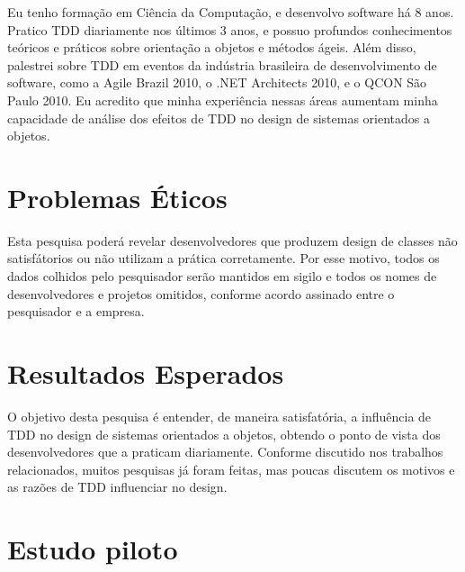 Eu tenho formação em Ciência da Computação, e desenvolvo software há 8
anos. Pratico TDD diariamente nos últimos 3 anos, e possuo profundos
conhecimentos teóricos e práticos sobre orientação a objetos e métodos ágeis.
Além disso, palestrei sobre TDD em eventos da indústria brasileira
de desenvolvimento de software, como a Agile Brazil 2010, o .NET Architects
2010, e o QCON São Paulo 2010. Eu acredito que minha experiência nessas
áreas aumentam minha capacidade de análise dos efeitos de TDD no design de sistemas 
orientados a objetos.

\section{Problemas Éticos}
\label{sec:planejamento-etica}

Esta pesquisa poderá revelar desenvolvedores que produzem design de classes não
satisfátorios ou não utilizam a prática corretamente.
Por esse motivo, todos os dados colhidos pelo pesquisador serão mantidos em
sigilo e todos os nomes de desenvolvedores e projetos omitidos, conforme acordo 
assinado entre o pesquisador e a empresa.

\section{Resultados Esperados}
\label{sec:planejamento-resultados-esperados}

O objetivo desta pesquisa é entender, de maneira satisfatória, a influência de 
TDD no design de sistemas orientados a objetos, obtendo o ponto de vista dos 
desenvolvedores que a praticam diariamente. Conforme discutido nos trabalhos 
relacionados, muitos pesquisas já foram feitas, mas poucas discutem os motivos 
e as razões de TDD influenciar no design.

\section{Estudo piloto}

